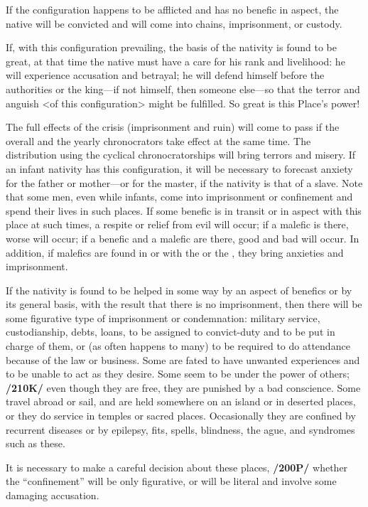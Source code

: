 If the configuration happens to be afflicted and has no benefic in aspect, the native will be convicted and will come into chains,
imprisonment, or custody. 

If, with this configuration prevailing, the basis of the nativity is found to be great, at that time the native must have a care for his rank and livelihood: he will experience accusation and betrayal; he will defend himself before the authorities or the king—if not himself, then someone else—so that the terror and anguish <of this configuration> might be fulfilled. So great is this Place’s power!

The full effects of the crisis (imprisonment and ruin) will come to pass if the overall and the yearly chronocrators take effect at the same time. The distribution using the cyclical chronocratorships will bring terrors and misery. If an infant nativity has this configuration, it will be necessary to forecast anxiety for the father or mother—or for the master, if the nativity is that of a slave. Note that some men, even while infants, come into imprisonment or confinement and spend their lives in such places. If some benefic is in transit or in aspect with this place at such times, a respite or relief from evil will occur; if a malefic is there, worse will occur; if a benefic and a malefic are there, good and bad will occur. In addition, if malefics are found in \Opposition\xspace or \Square\xspace with the \Sun\xspace or the \Moon, they bring anxieties and imprisonment.

If the nativity is found to be helped in some way by an aspect of benefics or by its general basis, with the result that there is no imprisonment, then there will be some figurative type of imprisonment or condemnation: military service, custodianship, debts, loans, to be assigned to convict-duty and to be put in charge of them, or (as often happens to many) to be required to do attendance because of the law or business. Some are fated to have unwanted experiences and to be unable to act as they desire. Some seem to be under the power of others; \textbf{/210K/} even though they are free, they are punished by a bad conscience. Some travel abroad or sail, and are held somewhere on an island or in deserted places, or they do service in temples or sacred places. Occasionally they are confined by recurrent diseases or by epilepsy, fits, spells, blindness, the ague, and syndromes such as these. 

It is necessary to make a careful decision about these places, \textbf{/200P/} whether the “confinement” will be only figurative, or will be literal and involve some damaging accusation.

